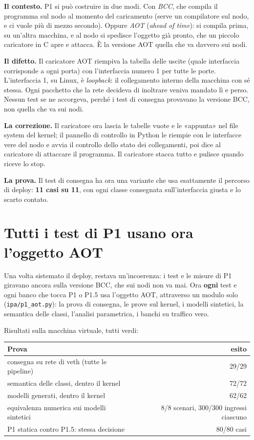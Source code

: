 \documentclass[11pt,a4paper,oneside]{report}
\begin{document}
\textbf{Il contesto.} P1 si può costruire in due modi. Con \emph{BCC}, che compila
il programma sul nodo al momento del caricamento (serve un compilatore sul nodo,
e ci vuole più di mezzo secondo). Oppure \emph{AOT} (\emph{ahead of time}): si
compila prima, su un'altra macchina, e al nodo si spedisce l'oggetto già pronto,
che un piccolo caricatore in C apre e attacca. È la versione AOT quella che va
davvero sui nodi.

\textbf{Il difetto.} Il caricatore AOT riempiva la tabella delle uscite (quale
interfaccia corrisponde a ogni porta) con l'interfaccia numero 1 per tutte le
porte. L'interfaccia 1, su Linux, è \emph{loopback}: il collegamento interno della
macchina con sé stessa. Ogni pacchetto che la rete decideva di inoltrare veniva
mandato lì e perso. Nessun test se ne accorgeva, perché i test di consegna
provavano la versione BCC, non quella che va sui nodi.

\textbf{La correzione.} Il caricatore ora lascia le tabelle vuote e le «appunta»
nel file system del kernel; il pannello di controllo in Python le riempie con le
interfacce vere del nodo e avvia il controllo dello stato dei collegamenti, poi
dice al caricatore di attaccare il programma. Il caricatore stacca tutto e pulisce
quando riceve lo stop.

\textbf{La prova.} Il test di consegna ha ora una variante che usa esattamente il
percorso di deploy: \textbf{11 casi su 11}, con ogni classe consegnata
sull'interfaccia giusta e lo scarto contato.

\section{Tutti i test di P1 usano ora l'oggetto AOT}

Una volta sistemato il deploy, restava un'incoerenza: i test e le misure di P1
giravano ancora sulla versione BCC, che sui nodi non va mai. Ora \textbf{ogni}
test e ogni banco che tocca P1 o P1.5 usa l'oggetto AOT, attraverso un modulo
solo (\texttt{ipa/p1\_aot.py}): la prova di consegna, le prove sul kernel, i
modelli sintetici, la semantica delle classi, l'analisi parametrica, i banchi su
traffico vero.

Risultati sulla macchina virtuale, tutti verdi:

\begin{center}
\small
\begin{tabular}{@{}lr@{}}
\toprule
\textbf{Prova} & \textbf{esito} \\
\midrule
consegna su rete di veth (tutte le pipeline) & 29/29 \\
semantica delle classi, dentro il kernel & 72/72 \\
modelli generati, dentro il kernel & 62/62 \\
equivalenza numerica sui modelli sintetici & 8/8 scenari, 300/300 ingressi ciascuno \\
P1 statica contro P1.5: stessa decisione & 80/80 casi \\
\bottomrule
\end{tabular}
\end{center}
\end{document}
